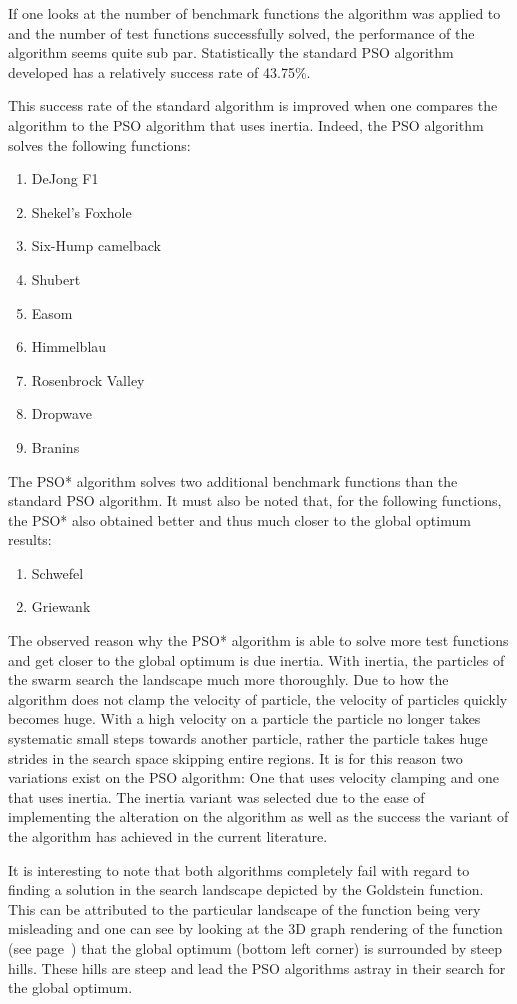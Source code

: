 If one looks at the number of benchmark functions the algorithm was applied to and the number of test functions successfully solved, the performance of the algorithm seems quite sub par. Statistically the standard PSO algorithm developed has a relatively success rate of 43.75\%.

This success rate of the standard algorithm is improved when one compares the algorithm to the PSO algorithm that uses inertia. Indeed, the PSO algorithm solves the following functions:
\begin{enumerate}
\item DeJong F1 
\item Shekel's Foxhole
\item Six-Hump camelback
\item Shubert
\item Easom
\item Himmelblau
\item Rosenbrock Valley
\item Dropwave
\item Branins
\end{enumerate}
The PSO* algorithm solves two additional benchmark functions than the standard PSO algorithm. It must also be noted that, for the following functions, the PSO* also obtained better and thus much closer to the global optimum results:
\begin{enumerate}
\item Schwefel
\item Griewank
\end{enumerate}
The observed reason why the PSO* algorithm is able to solve more test functions and get closer to the global optimum is due inertia. With inertia, the particles of the swarm search the landscape much more thoroughly. Due to how the algorithm does not clamp the velocity of particle, the velocity of particles quickly becomes huge. With a high velocity on a particle the particle no longer takes systematic small steps towards another particle, rather the particle takes huge strides in the search space skipping entire regions. It is for this reason two variations exist on the PSO algorithm: One that uses velocity clamping and one that uses inertia. The inertia variant was selected due to the ease of implementing the alteration on the algorithm as well as the success the variant of the algorithm has achieved in the current literature.

It is interesting to note that both algorithms completely fail with regard to finding a solution in the search landscape depicted by the Goldstein function. This can be attributed to the particular landscape of the function being very misleading and one can see by looking at the 3D graph rendering of the function (see page~\pageref{fig:GoldsteinGraph}) that the global optimum (bottom left corner) is surrounded by steep hills. These hills are steep and lead the PSO algorithms astray in their search for the global optimum.

